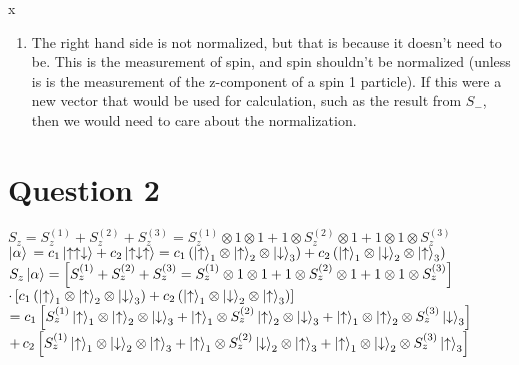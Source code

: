 x\documentclass[12pt]{article}
\begin{document}
\begin{enumerate}[label=\alph*)]
\item The right hand side is not normalized, but that is because it doesn't need to be. This is the measurement of spin, and spin shouldn't be normalized (unless is is the measurement of the z-component of a spin 1 particle). If this were a new vector that would be used for calculation, such as the result from $S_-$, then we would need to care about the normalization. 
\end{enumerate}
\newpage


\section*{Question 2}
$S_z = S_z^{(1)} + S_z^{(2)} + S_z^{(3)} = S_z^{(1)}\otimes 1 \otimes 1 + 1 \otimes S_z^{(2)} \otimes 1 + 1 \otimes 1 \otimes S_z^{(3)}$\vspace{0.5em}\\
$\ket{\alpha} \, = c_1 \ket{\uparrow\uparrow\downarrow} + c_2 \ket{\uparrow\downarrow\uparrow} = c_1\left(\ket{\uparrow}_1 \otimes \ket{\uparrow}_2 \otimes \ket{\downarrow}_3\right) + c_2\left(\ket{\uparrow}_1 \otimes \ket{\downarrow}_2 \otimes \ket{\uparrow}_3\right)$\vspace{1em}\\
$S_z \ket{\alpha} = \left[S_z^{(1)} + S_z^{(2)} + S_z^{(3)} = S_z^{(1)}\otimes 1 \otimes 1 + 1 \otimes S_z^{(2)} \otimes 1 + 1 \otimes 1 \otimes S_z^{(3)}\right]$\vspace{0.5em}\\
\hspace*{5em} $\cdot\left[c_1\left(\ket{\uparrow}_1 \otimes \ket{\uparrow}_2 \otimes \ket{\downarrow}_3\right) + c_2\left(\ket{\uparrow}_1 \otimes \ket{\downarrow}_2 \otimes \ket{\uparrow}_3 \right)\right]$\vspace{0.5em}\\
\hspace*{3em}$= c_1\left[S_z^{(1)}\ket{\uparrow}_1 \otimes \ket{\uparrow}_2 \otimes \ket{\downarrow}_3 + \ket{\uparrow}_1\otimes S_z^{(2)}\ket{\uparrow}_2 \otimes \ket{\downarrow}_3 + \ket{\uparrow}_1 \otimes \ket{\uparrow}_2 \otimes S_z^{(3)}\ket{\downarrow}_3\right]$\vspace{0.5em}\\
\hspace*{5em}$+ \, c_2\left[S_z^{(1)}\ket{\uparrow}_1 \otimes \ket{\downarrow}_2 \otimes \ket{\uparrow}_3 + \ket{\uparrow}_1\otimes S_z^{(2)}\ket{\downarrow}_2 \otimes \ket{\uparrow}_3 + \ket{\uparrow}_1 \otimes \ket{\downarrow}_2 \otimes S_z^{(3)}\ket{\uparrow}_3\right]$\vspace{0.5em}\\
\end{document}
